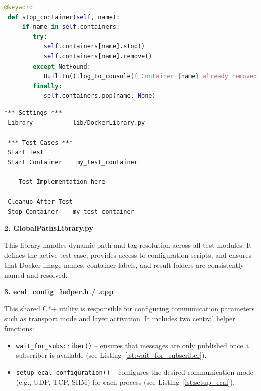 \vspace{1em}
\begin{lstlisting}[style=cppstyle, language=Python, caption={Example keyword implementation in \texttt{DockerLibrary.py}}, label={lst:docker_py_stop}, captionpos=b]
 @keyword
 def stop_container(self, name):
     if name in self.containers:
        try:
           self.containers[name].stop()
           self.containers[name].remove()
        except NotFound:
           BuiltIn().log_to_console(f"Container {name} already removed.")
        finally:
           self.containers.pop(name, None)
\end{lstlisting}

\vspace{0.5em}
\begin{lstlisting}[style=cppstyle, caption={Calling \texttt{Stop Container} in a Robot Framework test}, label={lst:docker_robot_stop}, captionpos=b]
 *** Settings ***
 Library           lib/DockerLibrary.py	
 
 *** Test Cases ***
 Start Test
 Start Container    my_test_container
 
 ---Test Implementation here---  
 
 Cleanup After Test
 Stop Container    my_test_container
\end{lstlisting}

\vspace{1em}
\textbf{2. GlobalPathsLibrary.py}

\vspace{0.3em}
This library handles dynamic path and tag resolution across all test modules. It defines the active test case, provides access to configuration scripts, and ensures that Docker image names, container labels, and result folders are consistently named and resolved.

\clearpage
\vspace{1em}
\textbf{3. ecal\_config\_helper.h / .cpp}

\vspace{0.3em}
This shared C*+ utility is responsible for configuring communication parameters such as transport mode and layer activation. It includes two central helper functions:

\begin{itemize}
	\item \texttt{wait\_for\_subscriber()} – ensures that messages are only published once a subscriber is available (see Listing~\ref{lst:wait_for_subscriber}).
	\item \texttt{setup\_ecal\_configuration()} – configures the desired communication mode (e.g., UDP, TCP, SHM) for each process (see Listing~\ref{lst:setup_ecal}).
\end{itemize}

